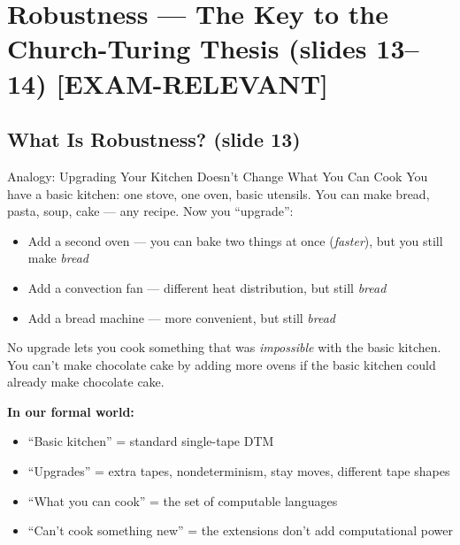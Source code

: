 \documentclass[11pt,a4paper]{article}
\newcommand{\kemark}{\textcolor{red!70!black}{\textbf{[EXAM-RELEVANT]}}}
\begin{document}
\newpage
\section{Robustness --- The Key to the Church-Turing Thesis (slides 13--14) \kemark}

\subsection{What Is Robustness? (slide 13)}

\begin{notebox}{Analogy: Upgrading Your Kitchen Doesn't Change What You Can Cook}
You have a basic kitchen: one stove, one oven, basic utensils. You can make bread, pasta, soup, cake --- any recipe. Now you ``upgrade'':
\begin{itemize}[nosep]
\item Add a second oven --- you can bake two things at once (\textit{faster}), but you still make \textit{bread}
\item Add a convection fan --- different heat distribution, but still \textit{bread}
\item Add a bread machine --- more convenient, but still \textit{bread}
\end{itemize}
No upgrade lets you cook something that was \textit{impossible} with the basic kitchen. You can't make chocolate cake by adding more ovens if the basic kitchen could already make chocolate cake.

\textbf{In our formal world:}
\begin{itemize}[nosep]
\item ``Basic kitchen'' = standard single-tape DTM
\item ``Upgrades'' = extra tapes, nondeterminism, stay moves, different tape shapes
\item ``What you can cook'' = the set of computable languages
\item ``Can't cook something new'' = the extensions don't add computational power
\end{itemize}
\end{notebox}
\end{document}
